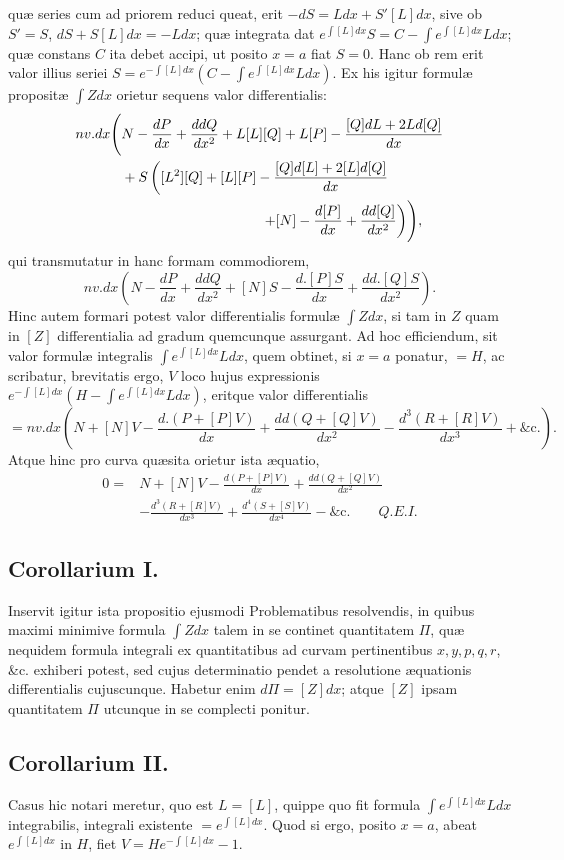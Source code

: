 quæ series cum ad priorem reduci queat, erit $-dS=Ldx+S'[L]dx$, sive ob $S'=S$, $dS+S[L]dx=-Ldx$; quæ integrata dat $e^{\int[L]dx}S=C-\int e^{\int[L]dx}Ldx$; quæ constans $C$ ita debet accipi, ut posito $x=a$ fiat $S=0$. Hanc ob rem erit valor illius seriei $S=e^{-\int[L]dx}(C-\int e^{\int[L]dx}Ldx)$. Ex his igitur formulæ propositæ $\int Zdx$ orietur sequens valor differentialis:
\[
\begin{aligned}
nv.dx\Biggl(&N-\frac{dP}{dx}+\frac{ddQ}{dx^2}+L[L][Q]+L[P]-\frac{[Q]dL+2Ld[Q]}{dx}\\
&+S\left([L^2][Q]+[L][P]-\frac{[Q]d[L]+2[L]d[Q]}{dx}\right.\\
&\hspace{35mm}\left.+[N]-\frac{d[P]}{dx}+\frac{dd[Q]}{dx^2}\right)\Biggr),
\end{aligned}
\]
qui transmutatur in hanc formam commodiorem,
\[
nv.dx\left(N-\frac{dP}{dx}+\frac{ddQ}{dx^2}+[N]S-\frac{d.[P]S}{dx}+\frac{dd.[Q]S}{dx^2}\right).
\]
Hinc autem formari potest valor differentialis formulæ $\int Zdx$, si tam in $Z$ quam in $[Z]$ differentialia ad gradum quemcunque assurgant. Ad hoc efficiendum, sit valor formulæ integralis $\int e^{\int[L]dx}Ldx$, quem obtinet, si $x=a$ ponatur, $=H$, ac scribatur, brevitatis ergo, $V$ loco hujus expressionis $e^{-\int[L]dx}(H-\int e^{\int[L]dx}Ldx)$, eritque valor differentialis
\[
=nv.dx\left(N+[N]V-\frac{d.(P+[P]V)}{dx}+\frac{dd(Q+[Q]V)}{dx^2}-\frac{d^3(R+[R]V)}{dx^3}+\text{\&c.}\right).
\]
Atque hinc pro curva quæsita orietur ista æquatio,
\[
\begin{aligned}
0={}&N+[N]V-\frac{d(P+[P]V)}{dx}+\frac{dd(Q+[Q]V)}{dx^2}\\
&-\frac{d^3(R+[R]V)}{dx^3}+\frac{d^4(S+[S]V)}{dx^4}-\text{\&c.}\qquad\textit{Q.E.I.}
\end{aligned}
\]
\subsection*{Corollarium I.}
 Inservit igitur ista propositio ejusmodi Problematibus resolvendis, in quibus maximi minimive formula $\int Zdx$ talem in se continet quantitatem $\Pi$, quæ nequidem formula integrali ex quantitatibus ad curvam pertinentibus $x,y,p,q,r$, \&c. exhiberi potest, sed cujus determinatio pendet a resolutione æquationis differentialis cujuscunque. Habetur enim $d\Pi=[Z]dx$; atque $[Z]$ ipsam quantitatem $\Pi$ utcunque in se complecti ponitur.
\subsection*{Corollarium II.}
 Casus hic notari meretur, quo est $L=[L]$, quippe quo fit formula $\int e^{\int[L]dx}Ldx$ integrabilis, integrali existente $=e^{\int[L]dx}$. Quod si ergo, posito $x=a$, abeat $e^{\int[L]dx}$ in $H$, fiet $V=He^{-\int[L]dx}-1$.
